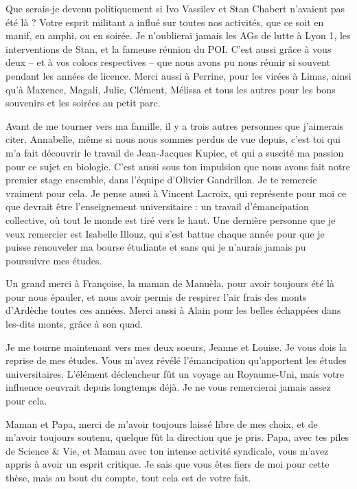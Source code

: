Que serais-je devenu politiquement si Ivo Vassilev et Stan Chabert n'avaient pas \'et\'e l\`a ? Votre esprit militant a influ\'e sur toutes nos activit\'es, que ce soit en manif, en amphi, ou en soir\'ee. Je n'oublierai jamais les AGs de lutte \`a Lyon 1, les interventions de Stan, et la fameuse r\'eunion du POI. C'est aussi gr\^ace \`a vous deux -- et \`a vos colocs respectives -- que nous avons pu nous r\'eunir si souvent pendant les ann\'ees de licence.
Merci aussi \`a Perrine, pour les vir\'ees \`a Limas, ainsi qu'\`a Maxence, Magali, Julie, Cl\'ement, M\'elissa et tous les autres pour les bons souvenirs et les soir\'ees au petit parc.

Avant de me tourner vers ma famille, il y a trois autres personnes que j'aimerais citer. Annabelle, m\^eme si nous nous sommes perdus de vue depuis, c'est toi qui m'a fait d\'ecouvrir le travail de Jean-Jacques Kupiec, et qui a suscit\'e ma passion pour ce sujet en biologie. C'est aussi sous ton impulsion que nous avons fait notre premier stage ensemble, dans l'\'equipe d'Olivier Gandrillon. Je te remercie vraiment pour cela. Je pense aussi \`a Vincent Lacroix, qui repr\'esente pour moi ce que devrait \^etre l'enseignement universitaire : un travail d'\'emancipation collective, o\`u tout le monde est tir\'e vers le haut. Une derni\`ere personne que je veux remercier est Isabelle Illouz, qui s'est battue chaque ann\'ee pour que je puisse renouveler ma bourse \'etudiante et sans qui je n'aurais jamais pu poursuivre mes \'etudes.

Un grand merci \`a Fran\c coise, la maman de Manu\`ela, pour avoir toujours \'et\'e l\`a pour nous \'epauler, et nous avoir permis de respirer l'air frais des monts d'Ard\`eche toutes ces ann\'ees. Merci aussi \`a Alain pour les belles \'echapp\'ees dans les-dits monts, gr\^ace \`a son quad.

Je me tourne maintenant vers mes deux soeurs, Jeanne et Louise. Je vous dois la reprise de mes \'etudes. Vous m'avez r\'ev\'el\'e l'\'emancipation qu'apportent les \'etudes universitaires. L'\'el\'ement d\'eclencheur f\^ut un voyage au Royaume-Uni, mais votre influence oeuvrait depuis longtemps d\'ej\`a. Je ne vous remercierai jamais assez pour cela.

Maman et Papa, merci de m'avoir toujours laiss\'e libre de mes choix, et de m'avoir toujours soutenu, quelque f\^ut la direction que je pris. Papa, avec tes piles de Science \& Vie, et Maman avec ton intense activit\'e syndicale, vous m'avez appris \`a avoir un esprit critique. Je sais que vous \^etes fiers de moi pour cette th\`ese, mais au bout du compte, tout cela est de votre fait.

